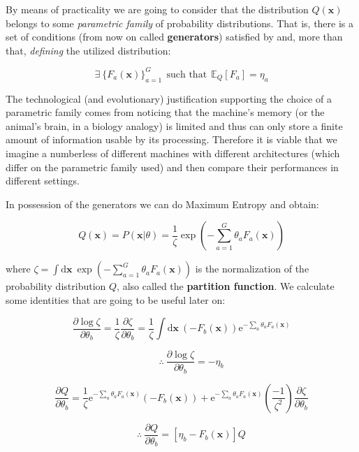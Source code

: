 \documentclass[12pt,a4paperpaper,]{tufte-book}
\begin{document}
By means of practicality we are going to consider that the distribution \(Q(\mathbf{x})\) belongs to some \emph{parametric family} of probability distributions. That is, there is a set of conditions (from now on called \textbf{generators}) satisfied by and, more than that, \emph{defining} the utilized distribution:

\[ \exists\ \{F_a(\mathbf{x})\}_{a=1}^G\ \ \text{such that} \ \ \mathbb{E}_Q[F_a] = \eta_a \]

The technological (and evolutionary) justification supporting the choice of a parametric family comes from noticing that the machine's memory (or the animal's brain, in a biology analogy) is limited and thus can only store a finite amount of information usable by its processing. Therefore it is viable that we imagine a numberless of different machines with different architectures (which differ on the parametric family used) and then compare their performances in different settings.

In possession of the generators we can do Maximum Entropy and obtain:

\[Q(\mathbf{x}) = P(\mathbf{x}|\theta) = \frac1\zeta \exp\left(- \sum_{a=1}^G \theta_a F_a(\mathbf{x}) \right)\]

where \(\zeta = \int \mathrm{d}\mathbf{x}\ \exp\left(- \sum_{a=1}^G \theta_a F_a(\mathbf{x})\right)\) is the normalization of the probability distribution \(Q\), also called the \textbf{partition function}. We calculate some identities that are going to be useful later on:

\[  \frac{\partial \log \zeta}{\partial \theta_b} = \frac1\zeta \frac{\partial \zeta}{\partial \theta_b} = \frac1\zeta \int \mathrm{d}\mathbf{x}\ (-F_b(\mathbf{x})) \mathrm{e}^{- \sum_a \theta_a F_a(\mathbf{x})} \]

\begin{equation} \qquad\therefore\ \frac{\partial \log \zeta}{\partial \theta_b} = - \eta_b \label{eq:ident1}\end{equation}

\[  \frac{\partial Q}{\partial \theta_b} = \frac1\zeta \mathrm{e}^{- \sum_a \theta_a F_a(\mathbf{x})} \left( -F_b(\mathbf{x})\right) +  \mathrm{e}^{- \sum_a \theta_a F_a(\mathbf{x})} \left( \frac{-1}{\zeta^2} \right) \frac{\partial \zeta}{\partial \theta_b} \]

\begin{equation} \qquad\therefore\ \frac{\partial Q}{\partial \theta_b} = [\eta_b - F_b(\mathbf{x})] Q \label{eq:ident2}\end{equation}
\end{document}
